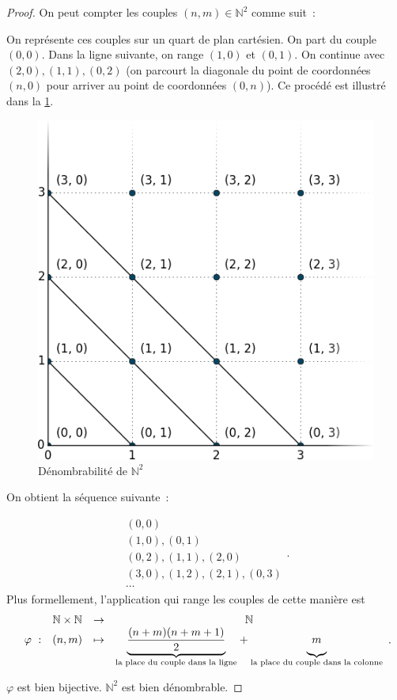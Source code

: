 \documentclass[a4paper,french,final]{memoir}
\begin{document}
\begin{proof} 
	On peut compter les couples $(n,m) \in \mathbb{N}^2$ comme suit~: \par On représente ces couples sur un quart de plan cartésien. 
	On part du couple $(0, 0)$. Dans la ligne suivante, on range $(1,0) $ et $(0,1)$. On continue avec $(2,0), (1,1), (0,2)$ (on parcourt la diagonale du point de coordonnées $(n,0)$ pour arriver au point de coordonnées $(0,n)$). Ce procédé est illustré dans la  \cref{fig-n_croix_n}.
	\begin{figure}[htb]
		\centering
		\includegraphics[scale=0.3]{n_croix_n.png}
		\caption{Dénombrabilité de $\mathbb{N}^2$}
		\label{fig-n_croix_n}
	\end{figure}
	
	On obtient la séquence suivante~:
	
	\[\begin{array}{l}
		(0,0) \\
		(1,0), (0,1) \\
		(0,2), (1,1), (2,0) \\
		(3,0), (1,2), (2,1), (0,3) \\
		\cdots
	\end{array}.\]
	Plus formellement, l'application qui range les couples de cette manière est 
	\[\begin{array}{cccc}
		\ & \mathbb{N} \times \mathbb{N} & \to & \mathbb{N} \\
		\varphi~: & (n,m) & \mapsto & {\underbrace{\frac{(n+m)(n+m+1)}{2}}_{\text{la place du couple dans la ligne}}} +  {\underbrace{\vphantom{\frac{(n+m)(n+m+1)}{2}} m}_{\text{la place du couple dans la colonne}}}
	\end{array}.\]
	
	
	$\varphi$ est bien bijective. $\mathbb{N}^2$ est bien dénombrable.
\end{proof}
\end{document}
